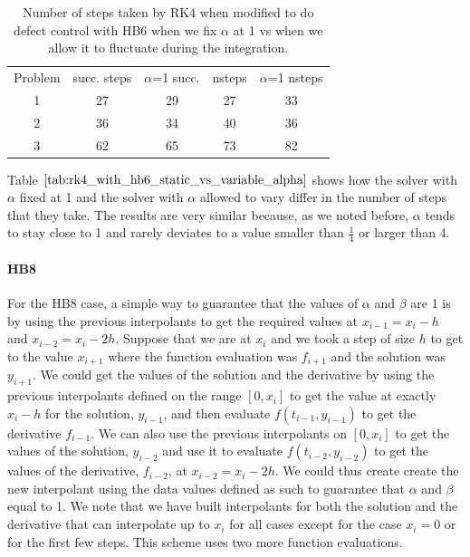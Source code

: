 \begin{table}[h]
\caption {Number of steps taken by RK4 when modified to do defect control with HB6 when we fix $\alpha$ at 1 vs when we allow it to fluctuate during the integration.} \label{tab:rk4_with_hb6_static_vs_variable_alpha}
\begin{center}
\begin{tabular}{ c c c c c } 
Problem & succ. steps & $\alpha$=1 succ. & nsteps & $\alpha$=1 nsteps \\ 
1       & 27                      &        29               & 27         & 33\\ 
2       & 36                      &        34               & 40         & 36\\
3       & 62                      &        65               & 73         & 82\\
\end{tabular}
\end{center}
\end{table}

Table $\ref{tab:rk4_with_hb6_static_vs_variable_alpha}$ shows how the solver with $\alpha$ fixed at 1 and the solver with $\alpha$ allowed to vary differ in the number of steps that they take. The results are very similar because, as we noted before, $\alpha$ tends to stay close to 1 and rarely deviates to a value smaller than $\frac{1}{4}$ or larger than 4.

\paragraph{HB8} For the HB8 case, a simple way to guarantee that the values of $\alpha$ and $\beta$ are 1 is by using the previous interpolants to get the required values at $x_{i - 1}=x_i-h$ and $x_{i - 2}=x_i-2h$. Suppose that we are at $x_i$ and we took a step of size $h$ to get to the value $x_{i + 1}$ where the function evaluation was $f_{i + 1}$ and the solution was $y_{i + 1}$. We could get the values of the solution and the derivative by using the previous interpolants defined on the range $[0, x_i]$ to get the value at exactly $x_i - h$ for the solution, $y_{i - 1}$, and then evaluate $f(t_{i-1}, y_{i-1})$ to get the derivative $f_{i - 1}$.  We can also use the previous interpolants on $[0, x_i]$ to get the values of the solution, $y_{i-2}$ and use it to evaluate $f(t_{i-2}, y_{i-2})$ to get the values of the derivative, $f_{i-2}$, at $x_{i-2} = x_i - 2h$. We could thus create create the new interpolant using the data values defined as such to guarantee that $\alpha$ and $\beta$ equal to 1. We note that we have built interpolants for both the solution and the derivative that  can interpolate up to $x_i$ for all cases except for the case $x_i = 0$ or for the first few steps. This scheme uses two more function evaluations.

